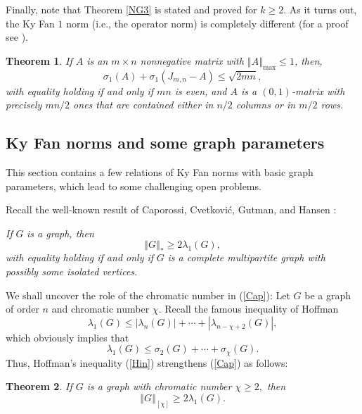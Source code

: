\documentclass[12pt]{article}%
\newtheorem{theorem}{Theorem}[section]
\begin{document}
Finally, note that Theorem \ref{NG3} is stated and proved for $k\geq2.$ As it
turns out, the Ky Fan $1$ norm (i.e., the operator norm) is completely
different (for a proof see \cite{NiYu13}).

\begin{theorem}
\label{NG4}If $A$ is an $m\times n$ nonnegative matrix with $\left\Vert
A\right\Vert _{\max}\leq1$, then,
\begin{equation}
\sigma_{1}\left(  A\right)  +\sigma_{1}\left(  J_{m,n}-A\right)  \leq
\sqrt{2mn}, \label{sig1in}%
\end{equation}
with equality holding if and only if $mn$ is even, and $A$ is a $\left(
0,1\right)  $-matrix with precisely $mn/2$ ones that are contained either in
$n/2$ columns or in $m/2$ rows.
\end{theorem}

\subsection{\label{KFch}Ky Fan norms and some graph parameters}

This section contains a few relations of Ky Fan norms with basic graph
parameters, which lead to some challenging open problems.

Recall the well-known result of Caporossi, Cvetkovi\'{c}, Gutman, and Hansen
\cite{CCGH99}:\medskip

\emph{If }$G$\emph{ is a graph, then }%
\begin{equation}
\left\Vert G\right\Vert _{\ast}\geq2\lambda_{1}\left(  G\right)  , \label{Cap}%
\end{equation}
\emph{with equality holding if and only if }$G$\emph{ is a complete
multipartite graph with possibly some isolated vertices.}\medskip

We shall uncover the role of the chromatic number in (\ref{Cap}): Let $G$ be a
graph of order $n$ and chromatic number $\chi.$ Recall the famous inequality
of Hoffman \cite{Hof70}
\begin{equation}
\lambda_{1}\left(  G\right)  \leq\left\vert \lambda_{n}\left(  G\right)
\right\vert +\cdots+\left\vert \lambda_{n-\chi+2}\left(  G\right)  \right\vert
,\label{Hin}%
\end{equation}
which obviously implies that
\[
\lambda_{1}\left(  G\right)  \leq\sigma_{2}\left(  G\right)  +\cdots
+\sigma_{\chi}\left(  G\right)  .
\]
Thus, Hoffman's inequality (\ref{Hin}) strengthens (\ref{Cap}) as follows:

\begin{theorem}
\label{tHof}If $G$ is a graph with chromatic number $\chi\geq2,$ then%
\begin{equation}
\left\Vert G\right\Vert _{\left[  \chi\right]  }\geq2\lambda_{1}\left(
G\right)  . \label{HKF}%
\end{equation}

\end{theorem}
\end{document}
